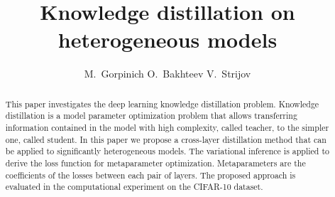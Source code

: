 \documentclass[runningheads]{llncs}
\begin{document}
%
\title{Knowledge distillation on heterogeneous models}%
%
%
\author{M.~Gorpinich
O.~Bakhteev
V.~Strijov
}
%
%
%
\maketitle              %
%
\begin{abstract}

This paper investigates the deep learning knowledge distillation problem. Knowledge distillation is a model parameter optimization problem that allows transferring information contained in the model with high complexity, called teacher, to the simpler one, called student. In this paper we propose a cross-layer distillation method that can be applied to significantly heterogeneous models. The variational inference is applied to derive the loss function for metaparameter optimization. Metaparameters are the coefficients of the losses between each pair of layers. The proposed approach is evaluated in the computational experiment on the CIFAR-10 dataset.

\end{abstract}
%
%
%
\end{document}
